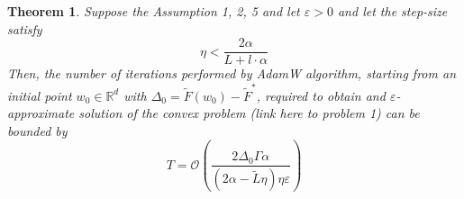 \documentclass{article}
\newtheorem{theorem}{Theorem}
\begin{document}
\begin{theorem}

Suppose the Assumption 1, 2, 5 and let $\varepsilon > 0$ and let the step-size satisfy
\begin{equation*}
    \eta < \frac{2 \alpha}{L + l \cdot \alpha} 
\end{equation*}
Then, the number of iterations performed by AdamW algorithm, starting from an initial point $w_0 \in \mathbb{R}^d$ with $\Delta_0 = \tilde{F}(w_0) - \tilde{F}^*$, required to obtain and $\varepsilon$-approximate solution of the convex problem (link here to problem 1) can be bounded by
\begin{equation*}
      T = \mathcal{O}\left( \frac{2\Delta_0 \Gamma \alpha } {(2\alpha - \tilde{L}\eta) \eta \varepsilon} \right)
\end{equation*}

\end{theorem}
\end{document}
